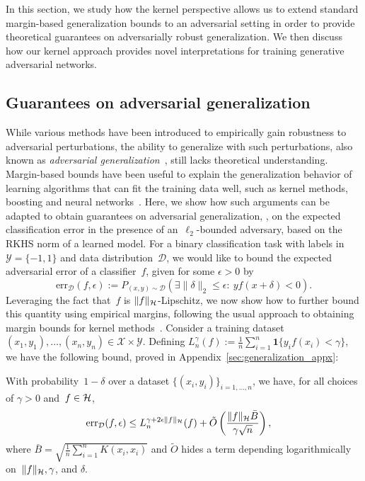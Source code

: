
In this section, we study how the kernel perspective allows us to extend standard margin-based generalization bounds 
to an adversarial setting in order to
provide theoretical guarantees on adversarially robust generalization.
We then discuss how our kernel approach provides novel interpretations for training
generative adversarial networks.

\subsection{Guarantees on adversarial generalization}
\label{sub:guarantees}

While various methods have been introduced to empirically gain robustness to adversarial perturbations,
the ability to generalize with such perturbations, also known as \emph{adversarial generalization}~\citep{schmidt2018adversarially},
still lacks theoretical understanding.
Margin-based bounds have been useful
to explain the generalization behavior of learning algorithms that can fit the training data
well, such as kernel methods, boosting and neural networks~\citep{koltchinskii2002empirical,boucheron2005theory,bartlett2017spectrally}.
Here, we show how such arguments can be adapted to obtain guarantees on adversarial generalization,
\ie, on the expected classification error in the presence of an~$\ell_2$-bounded adversary,
based on the RKHS norm of a learned model.
For a binary classification task with labels in $\mathcal Y = \{-1,1\}$ and data distribution~$\mathcal D$,
we would like to bound the expected adversarial error of a classifier~$f$, given for some $\epsilon > 0$ by
\begin{equation}
\label{eq:adv_error}
\text{err}_\mathcal D(f, \epsilon) := P_{(x,y) \sim \mathcal D} (\exists \|\delta\|_2 \leq \epsilon: ~y f(x + \delta) < 0).
\end{equation}
Leveraging the fact that~$f$ is $\|f\|_{\mathcal H}$-Lipschitz,
we now show how to further bound this quantity using empirical margins,
following the usual approach to obtaining margin bounds for kernel methods~\citep[\eg,][]{boucheron2005theory}.
Consider a training dataset $(x_1, y_1), \ldots, (x_n, y_n) \in \mathcal X \times \mathcal Y$.
Defining $L_n^\gamma(f) := \frac{1}{n} \sum_{i=1}^n \textbf{1}\{y_i f(x_i) < \gamma\}$,
we have the following bound, proved in Appendix~\ref{sec:generalization_appx}:
\begin{proposition}
\label{prop:robust_margin_bound}
With probability~$1 - \delta$ over a dataset $\{(x_i, y_i)\}_{i=1, \ldots, n}$, we have,
for all choices of $\gamma > 0$ and~$f \in {\mathcal H}$,
\begin{align}
\label{eq:robust_margin_bound}
& \text{err}_\mathcal D(f, \epsilon) \leq L_n^{\gamma + 2 \epsilon \|f\|_{\mathcal H}}(f) + \tilde{O}\left( \frac{\|f\|_{\mathcal H} \bar{B}}{\gamma \sqrt{n}}  \right),
\end{align}
where $\bar{B} = \sqrt{\frac{1}{n}\sum_{i=1}^n K(x_i, x_i)}$ and $\tilde{O}$ hides a term depending logarithmically on~$\|f\|_{\mathcal H}, \gamma$, and $\delta$.
\end{proposition}

